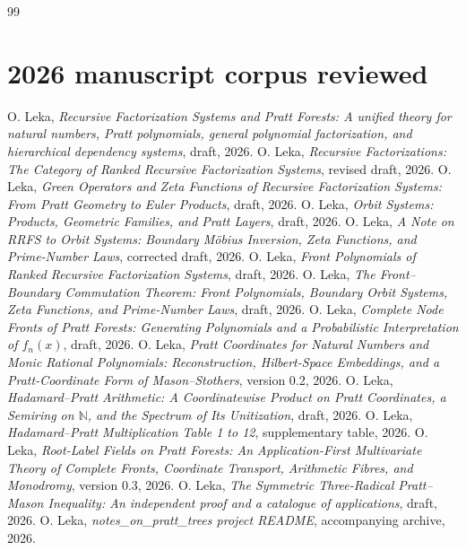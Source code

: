 \documentclass[11pt]{article}
\newcommand{\NN}{\mathbb N}
\begin{document}
\begin{thebibliography}{99}
\section*{2026 manuscript corpus reviewed}
 O. Leka, \emph{Recursive Factorization Systems and Pratt Forests: A unified theory for natural numbers, Pratt polynomials, general polynomial factorization, and hierarchical dependency systems}, draft, 2026.
 O. Leka, \emph{Recursive Factorizations: The Category of Ranked Recursive Factorization Systems}, revised draft, 2026.
 O. Leka, \emph{Green Operators and Zeta Functions of Recursive Factorization Systems: From Pratt Geometry to Euler Products}, draft, 2026.
 O. Leka, \emph{Orbit Systems: Products, Geometric Families, and Pratt Layers}, draft, 2026.
 O. Leka, \emph{A Note on RRFS to Orbit Systems: Boundary M\"obius Inversion, Zeta Functions, and Prime-Number Laws}, corrected draft, 2026.
 O. Leka, \emph{Front Polynomials of Ranked Recursive Factorization Systems}, draft, 2026.
 O. Leka, \emph{The Front--Boundary Commutation Theorem: Front Polynomials, Boundary Orbit Systems, Zeta Functions, and Prime-Number Laws}, draft, 2026.
 O. Leka, \emph{Complete Node Fronts of Pratt Forests: Generating Polynomials and a Probabilistic Interpretation of $f_n(x)$}, draft, 2026.
 O. Leka, \emph{Pratt Coordinates for Natural Numbers and Monic Rational Polynomials: Reconstruction, Hilbert-Space Embeddings, and a Pratt-Coordinate Form of Mason--Stothers}, version 0.2, 2026.
 O. Leka, \emph{Hadamard--Pratt Arithmetic: A Coordinatewise Product on Pratt Coordinates, a Semiring on $\NN$, and the Spectrum of Its Unitization}, draft, 2026.
 O. Leka, \emph{Hadamard--Pratt Multiplication Table 1 to 12}, supplementary table, 2026.
 O. Leka, \emph{Root-Label Fields on Pratt Forests: An Application-First Multivariate Theory of Complete Fronts, Coordinate Transport, Arithmetic Fibres, and Monodromy}, version 0.3, 2026.
 O. Leka, \emph{The Symmetric Three-Radical Pratt--Mason Inequality: An independent proof and a catalogue of applications}, draft, 2026.
 O. Leka, \emph{notes\_on\_pratt\_trees project README}, accompanying archive, 2026.
\end{thebibliography}
\end{document}
